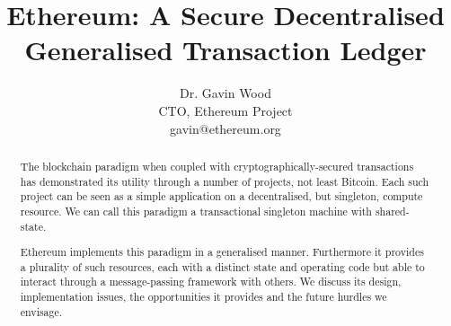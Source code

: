 \documentclass[9pt,oneside]{amsart}
\title{Ethereum: A Secure Decentralised Generalised Transaction Ledger}
\author{
    Dr. Gavin Wood\\
    CTO, Ethereum Project\\
    gavin@ethereum.org
}
\begin{document}
\pagecolor{lightyellow}

\begin{abstract}
The blockchain paradigm when coupled with cryptographically-secured transactions has demonstrated its utility through a number of projects, not least Bitcoin. Each such project can be seen as a simple application on a decentralised, but singleton, compute resource. We can call this paradigm a transactional singleton machine with shared-state.

Ethereum implements this paradigm in a generalised manner. Furthermore it provides a plurality of such resources, each with a distinct state and operating code but able to interact through a message-passing framework with others. We discuss its design, implementation issues, the opportunities it provides and the future hurdles we envisage.
\end{abstract}

\maketitle
\end{document}
